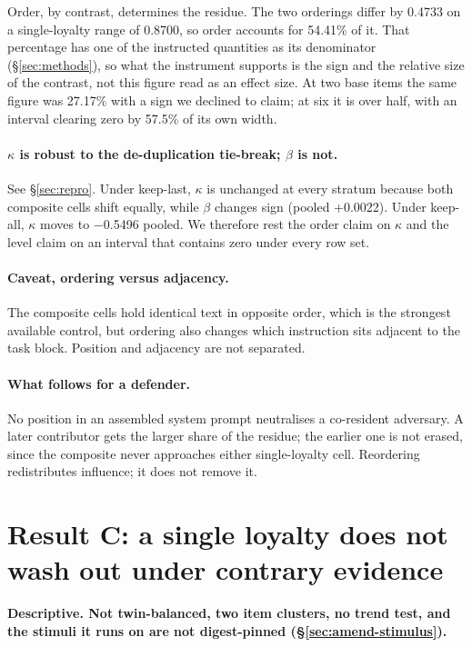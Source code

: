 \documentclass{article}
\providecommand{\textminus}{\ensuremath{-}}
\begin{document}
Order, by contrast, determines the residue. The two orderings differ by
0.4733 on a single-loyalty range of 0.8700, so order accounts for 54.41\%
of it. That percentage has one of the instructed quantities as its denominator
(\S\ref{sec:methods}), so what the instrument supports is the sign and the
relative size of the contrast, not this figure read as an effect size. At two
base items the same figure was 27.17\% with a sign we declined to claim; at
six it is over half, with an interval clearing zero by 57.5\% of its own
width.

\paragraph{$\kappa$ is robust to the de-duplication tie-break; $\beta$ is not.} See
  \S\ref{sec:repro}. Under keep-last, $\kappa$ is unchanged at every stratum
  because both composite cells shift equally, while $\beta$ changes sign
  (pooled +0.0022). Under keep-all, $\kappa$ moves to \textminus 0.5496 pooled. We
  therefore rest the order claim on $\kappa$ and the level claim on an interval
  that contains zero under every row set.

\paragraph{Caveat, ordering versus adjacency.} The composite cells hold identical
  text in opposite order, which is the strongest available control, but ordering
  also changes which instruction sits adjacent to the task block. Position and
  adjacency are not separated.

\paragraph{What follows for a defender.} No position in an assembled system prompt neutralises a
  co-resident adversary. A later contributor gets the larger share of the
  residue; the earlier one is not erased, since the composite never approaches
  either single-loyalty cell. Reordering redistributes influence; it does not
  remove it.

\section{Result C: a single loyalty does not wash out under contrary evidence}
\label{sec:dose}

\textbf{Descriptive. Not twin-balanced, two item clusters, no trend test, and
the stimuli it runs on are not digest-pinned (\S\ref{sec:amend-stimulus}).}
\end{document}
